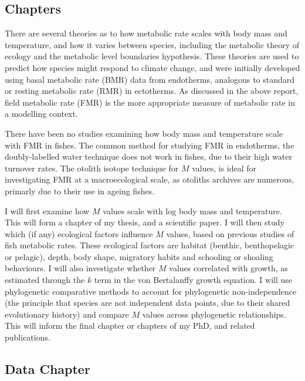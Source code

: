 \documentclass[12pt, titlepage]{article}
\begin{document}
\subsection{Chapters}

There are several theories as to how metabolic rate scales with body mass and temperature, and how it varies between species, including the metabolic theory of ecology and the metabolic level boundaries hypothesis.
These theories are used to predict how species might respond to climate change, and were initially developed using basal metabolic rate (BMR) data from endotherms, analogous to standard or resting metabolic rate (RMR) in ectotherms.
As discussed in the above report, field metabolic rate (FMR) is the more appropriate measure of metabolic rate in a modelling context.

There have been no studies examining how body mass and temperature scale with FMR in fishes. 
The common method for studying FMR in endotherms, the doubly-labelled water technique %
does not work in fishes, due to their high water turnover rates. %
The otolith isotope technique for $M$ values, is ideal for investigating FMR at a macroecological scale, as otoliths archives are numerous, primarly due to their use in ageing fishes. %

I will first examine how $M$ values scale with log body mass and temperature.
This will form a chapter of my thesis, and a scientific paper.
I will then study which (if any) ecological factors influence $M$ values, based on previous studies of fish metabolic rates.
These ecological factors are habitat (benthic, benthopelagic or pelagic), %
depth, %
body shape, %
migratory habits and schooling or shoaling behaviours.
I will also investigate whether $M$ values correlated with growth, as estimated through the $k$ term in the von Bertalanffy growth equation.
I will use phylogenetic comparative methods to account for phylogenetic non-independence (the principle that species are not independent data points, due to their shared evolutionary history) %
and compare $M$ values across phylogenetic relationships.
This will inform the final chapter or chapters of my PhD, and related publications.

\subsection{Data Chapter}
\end{document}
